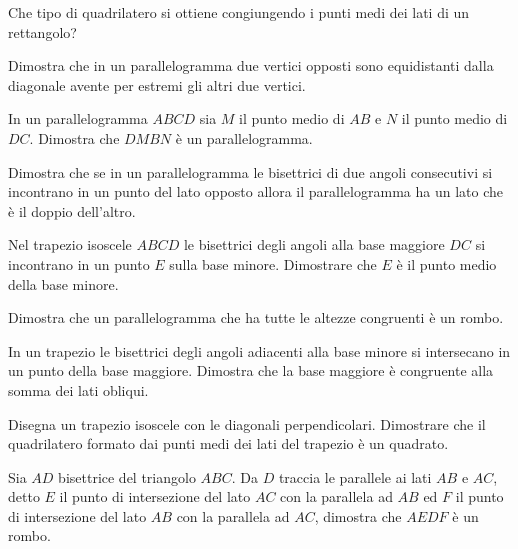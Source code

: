 \begin{multicols}{2}
\begin{esercizio}
\label{ese:4.51}
Che tipo di quadrilatero si ottiene congiungendo i punti medi dei lati di un rettangolo?
\end{esercizio}

\begin{esercizio}
\label{ese:4.52}
Dimostra che in un parallelogramma due vertici opposti sono equidistanti dalla diagonale avente per estremi gli altri due vertici.
\end{esercizio}

\begin{esercizio}
\label{ese:4.53}
In un parallelogramma $ABCD$ sia $M$ il punto medio di $AB$ e $N$ il punto medio di $DC$. Dimostra che $DMBN$ è un parallelogramma.
\end{esercizio}

\begin{esercizio}
\label{ese:4.54}
Dimostra che se in un parallelogramma le bisettrici di due angoli consecutivi si incontrano in un punto del lato opposto allora il parallelogramma ha un lato che è il doppio dell'altro.
\end{esercizio}

\begin{esercizio}
\label{ese:4.55}
Nel trapezio isoscele $ABCD$ le bisettrici degli angoli alla base maggiore $DC$ si incontrano in un punto $E$ sulla base minore. Dimostrare che $E$ è il punto medio della base minore.
\end{esercizio}

\begin{esercizio}
\label{ese:4.56}
Dimostra che un parallelogramma che ha tutte le altezze congruenti è un rombo.
\end{esercizio}

\begin{esercizio}
\label{ese:4.57}
In un trapezio le bisettrici degli angoli adiacenti alla base minore si intersecano in un punto della base maggiore. Dimostra che la base maggiore è congruente alla somma dei lati obliqui.
\end{esercizio}

\begin{esercizio}
\label{ese:4.58}
Disegna un trapezio isoscele con le diagonali perpendicolari. Dimostrare che il quadrilatero formato dai punti medi dei lati del trapezio è un quadrato.
\end{esercizio}

\begin{esercizio}
\label{ese:4.59}
Sia $AD$ bisettrice del triangolo $ABC$. Da $D$ traccia le parallele ai lati $AB$ e $AC$, detto $E$ il punto di intersezione del lato $AC$ con la parallela ad $AB$ ed $F$ il punto di intersezione del lato $AB$ con la parallela ad $AC$, dimostra che $AEDF$ è un rombo.
\end{esercizio}

\end{multicols}

